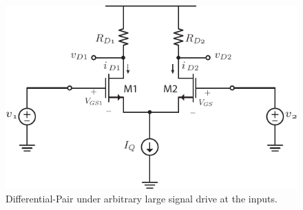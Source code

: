\begin{figure}[H]
\centering
\includegraphics[scale=1.15]{Diffamp_large_signal}
\caption{Differential-Pair under arbitrary large signal drive at the inputs.}
\label{fig:Diff_amp_large}
\end{figure}
